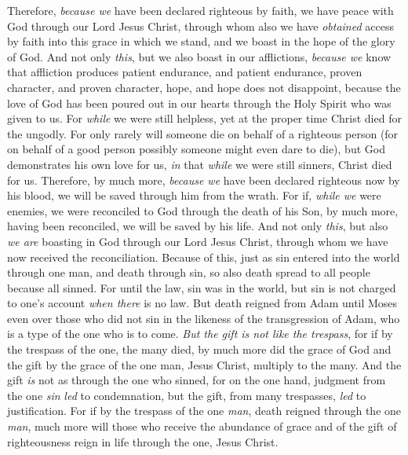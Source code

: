 \begin{biblechapter} %
 Therefore, \textit{because we} have been declared righteous by faith, we have peace with God through our Lord Jesus Christ,
\verse through whom also we have \textit{obtained} access by faith into this grace in which we stand, and we boast in the hope of the glory of God.
\verse And not only \textit{this}, but we also boast in our afflictions, \textit{because we} know that affliction produces patient endurance,
\verse and patient endurance, proven character, and proven character, hope,
\verse and hope does not disappoint, because the love of God has been poured out in our hearts through the Holy Spirit who was given to us.
\verse For \textit{while} we were still helpless, yet at the proper time Christ died for the ungodly.
\verse For only rarely will someone die on behalf of a righteous person (for on behalf of a good person possibly someone might even dare to die),
\verse but God demonstrates his own love for us, \textit{in} that \textit{while} we were still sinners, Christ died for us.
\verse Therefore, by much more, \textit{because we} have been declared righteous now by his blood, we will be saved through him from the wrath.
\verse For if, \textit{while we} were enemies, we were reconciled to God through the death of his Son, by much more, having been reconciled, we will be saved by his life.
\verse And not only \textit{this}, but also \textit{we are} boasting in God through our Lord Jesus Christ, through whom we have now received the reconciliation.
 Because of this, just as sin entered into the world through one man, and death through sin, so also death spread to all people because all sinned.
\verse For until the law, sin was in the world, but sin is not charged to one’s account \textit{when there} is no law.
\verse But death reigned from Adam until Moses even over those who did not sin in the likeness of the transgression of Adam, who is a type of the one who is to come.
\verse \textit{But the gift is not like the trespass}, for if by the trespass of the one, the many died, by much more did the grace of God and the gift by the grace of the one man, Jesus Christ, multiply to the many.
\verse And the gift \textit{is} not as through the one who sinned, for on the one hand, judgment from the one \textit{sin} \textit{led} to condemnation, but the gift, from many trespasses, \textit{led} to justification.
\verse For if by the trespass of the one \textit{man}, death reigned through the one \textit{man}, much more will those who receive the abundance of grace and of the gift of righteousness reign in life through the one, Jesus Christ.

\end{biblechapter}
